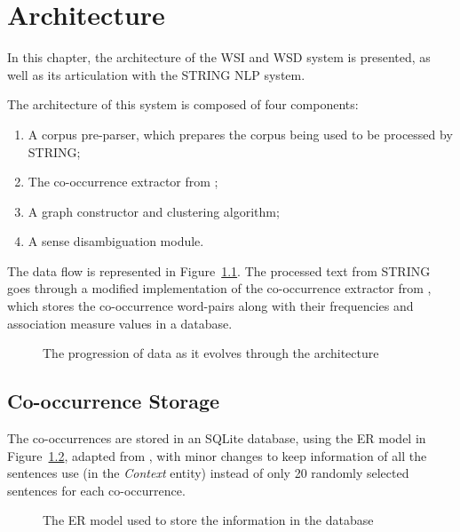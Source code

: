 \chapter{Architecture}
\label{ch:architecture}

In this chapter, the architecture of the \ac{WSI} and \ac{WSD} system is 
presented, as well as its 
articulation with the \ac{STRING} \ac{NLP} system.

The architecture of this system is composed of four components:

\begin{enumerate}
  \item A corpus pre-parser, which prepares the corpus being used to be
processed by \ac{STRING};
  \item The co-occurrence extractor from \citep{correia2015syntax};
  \item A graph constructor and clustering algorithm;
  \item A sense disambiguation module.
\end{enumerate}

The data flow is represented in Figure~\ref{fig:data-progression}. The 
processed text from \ac{STRING} 
goes through a modified implementation of the co-occurrence extractor from 
\citep{correia2015syntax}, which stores the co-occurrence word-pairs along with 
their frequencies and 
association measure values in a database.

\begin{figure}[ht]
 \caption{The progression of data as it evolves through the architecture}
 \label{fig:data-progression}
 \centering
 
\end{figure}

\section{Co-occurrence Storage}

The co-occurrences are stored in an SQLite database, using the \ac{ER} model in 
Figure~\ref{fig:er-model}, adapted from \citet{correia2015syntax}, with minor 
changes to keep information of all the sentences use (in the \emph{Context} 
entity) instead of only 20 randomly selected sentences for each co-occurrence.

\begin{figure}[ht]
    \caption{The \acl*{ER} model used to store the information in the database}
    \label{fig:er-model}
    \centering
    
\end{figure}

